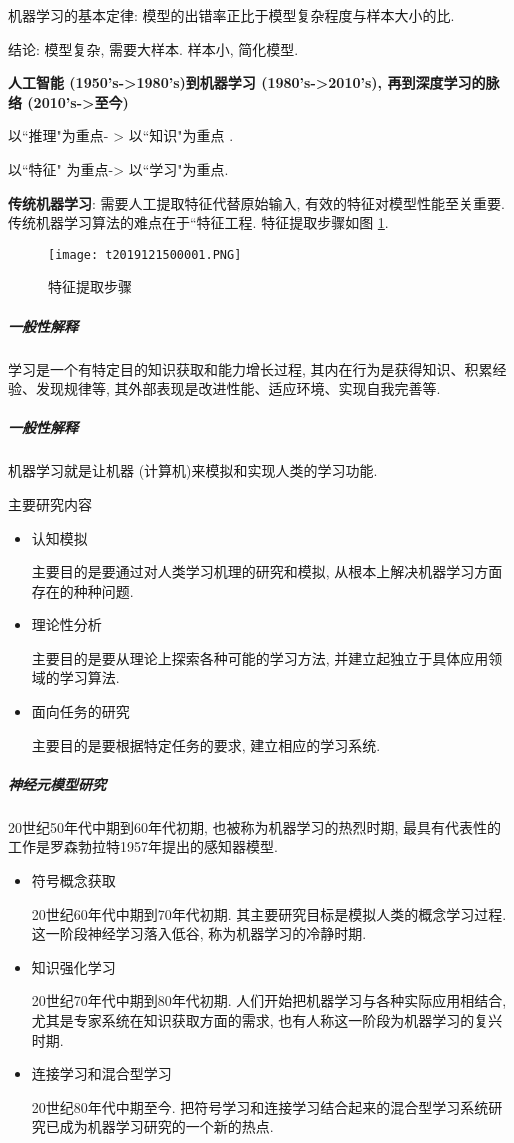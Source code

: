 机器学习的基本定律: 模型的出错率正比于模型复杂程度与样本大小的比.

结论:  模型复杂, 需要大样本. 样本小, 简化模型.

\textbf{人工智能 (1950's->1980's)到机器学习 (1980's->2010's), 再到深度学习的脉络 (2010's->至今)}
\begin{center}
以“推理"为重点- > 以“知识"为重点 .

以“特征" 为重点-> 以“学习"为重点.
\end{center}

\textbf{传统机器学习}:  需要人工提取特征代替原始输入, 有效的特征对模型性能至关重要. 传统机器学习算法的难点在于“特征工程. 特征提取步骤如图 \ref{AI32fig2019121501}.
\begin{figure}[H]
\centering
\texttt{[image: t2019121500001.PNG]}
\caption{特征提取步骤}
\label{AI32fig2019121501}
\end{figure}
\subparagraph{一般性解释}
学习是一个有特定目的知识获取和能力增长过程, 其内在行为是获得知识、积累经验、发现规律等, 其外部表现是改进性能、适应环境、实现自我完善等.
\subparagraph{一般性解释}
机器学习就是让机器 (计算机)来模拟和实现人类的学习功能.

主要研究内容
\begin{itemize}
\item 认知模拟

    主要目的是要通过对人类学习机理的研究和模拟, 从根本上解决机器学习方面存在的种种问题.
\item 理论性分析

     主要目的是要从理论上探索各种可能的学习方法, 并建立起独立于具体应用领域的学习算法.
\item 面向任务的研究

    主要目的是要根据特定任务的要求, 建立相应的学习系统.
\end{itemize}
\subparagraph{神经元模型研究}
 20世纪50年代中期到60年代初期, 也被称为机器学习的热烈时期, 最具有代表性的工作是罗森勃拉特1957年提出的感知器模型.
\begin{itemize}
\item 符号概念获取

    20世纪60年代中期到70年代初期. 其主要研究目标是模拟人类的概念学习过程. 这一阶段神经学习落入低谷, 称为机器学习的冷静时期.
\item 知识强化学习

    20世纪70年代中期到80年代初期. 人们开始把机器学习与各种实际应用相结合, 尤其是专家系统在知识获取方面的需求, 也有人称这一阶段为机器学习的复兴时期.
\item 连接学习和混合型学习

    20世纪80年代中期至今. 把符号学习和连接学习结合起来的混合型学习系统研究已成为机器学习研究的一个新的热点.
\end{itemize}
